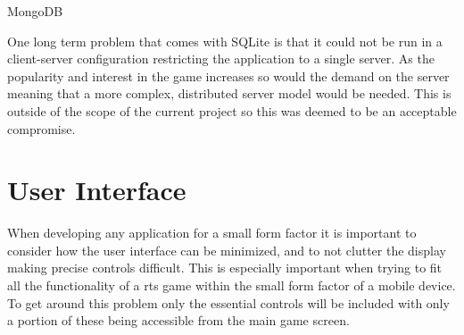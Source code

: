 MongoDB  

One long term problem that comes with SQLite is that it could not be run in a client-server configuration restricting the application to a single server. As the popularity and interest in the game increases so would the demand on the server meaning that a more complex, distributed server model would be needed. This is outside of the scope of the current project so this was deemed to be an acceptable compromise.

\section{User Interface}
When developing any application for a small form factor it is important to consider how the user interface can be minimized, and to not clutter the display making precise controls difficult. This is especially important when trying to fit all the functionality of a \gls{rts} game within the small form factor of a mobile device. To get around this problem only the essential controls will be included with only a portion of these being accessible from the main game screen.

